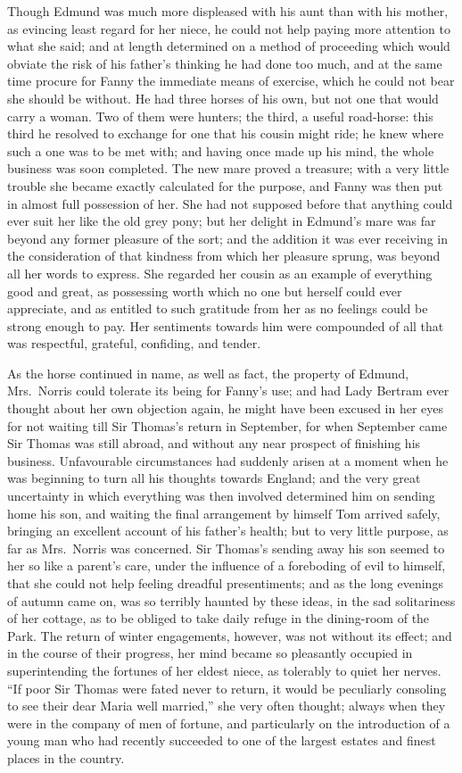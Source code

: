 \documentclass{article}
\begin{document}
Though Edmund was much more displeased with his aunt than
with his mother, as evincing least regard for her niece,
he could not help paying more attention to what she said;
and at length determined on a method of proceeding
which would obviate the risk of his father's thinking he
had done too much, and at the same time procure for Fanny
the immediate means of exercise, which he could not bear
she should be without.  He had three horses of his own,
but not one that would carry a woman.  Two of them
were hunters; the third, a useful road-horse: this third he
resolved to exchange for one that his cousin might ride;
he knew where such a one was to be met with; and having once
made up his mind, the whole business was soon completed.
The new mare proved a treasure; with a very little
trouble she became exactly calculated for the purpose,
and Fanny was then put in almost full possession of her.
She had not supposed before that anything could ever suit
her like the old grey pony; but her delight in Edmund's
mare was far beyond any former pleasure of the sort;
and the addition it was ever receiving in the consideration
of that kindness from which her pleasure sprung,
was beyond all her words to express.  She regarded
her cousin as an example of everything good and great,
as possessing worth which no one but herself could
ever appreciate, and as entitled to such gratitude
from her as no feelings could be strong enough to pay.
Her sentiments towards him were compounded of all that
was respectful, grateful, confiding, and tender.

As the horse continued in name, as well as fact,
the property of Edmund, Mrs.\ Norris could tolerate its being
for Fanny's use; and had Lady Bertram ever thought about
her own objection again, he might have been excused in her
eyes for not waiting till Sir Thomas's return in September,
for when September came Sir Thomas was still abroad,
and without any near prospect of finishing his business.
Unfavourable circumstances had suddenly arisen at a moment
when he was beginning to turn all his thoughts towards England;
and the very great uncertainty in which everything was then
involved determined him on sending home his son, and waiting
the final arrangement by himself Tom arrived safely,
bringing an excellent account of his father's health;
but to very little purpose, as far as Mrs.\ Norris
was concerned.  Sir Thomas's sending away his son seemed
to her so like a parent's care, under the influence of a
foreboding of evil to himself, that she could not help
feeling dreadful presentiments; and as the long evenings
of autumn came on, was so terribly haunted by these ideas,
in the sad solitariness of her cottage, as to be obliged
to take daily refuge in the dining-room of the Park.
The return of winter engagements, however, was not
without its effect; and in the course of their progress,
her mind became so pleasantly occupied in superintending
the fortunes of her eldest niece, as tolerably to quiet
her nerves.  ``If poor Sir Thomas were fated never to return,
it would be peculiarly consoling to see their dear Maria
well married,'' she very often thought; always when they
were in the company of men of fortune, and particularly on
the introduction of a young man who had recently succeeded
to one of the largest estates and finest places in the country.
\end{document}
